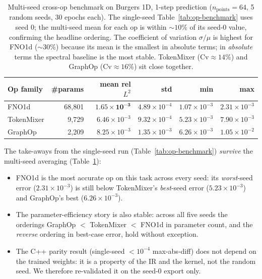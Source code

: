 \documentclass[10pt,twocolumn]{article}
\newcommand{\fno}{\textsc{FNO}}
\begin{document}
\begin{table}[t]
  \centering
  \small
  \begin{tabular}{lrrrrr}
    \toprule
    Op family   & \#params  & mean rel $L^2$ & std & min & max \\
    \midrule
    \fno{}1d    & 68{,}801 & $\mathbf{1.65 \times 10^{-3}}$ & $4.89 \times 10^{-4}$ & $1.07 \times 10^{-3}$ & $2.31 \times 10^{-3}$ \\
    TokenMixer  &  9{,}729 & $6.46 \times 10^{-3}$            & $9.32 \times 10^{-4}$ & $5.23 \times 10^{-3}$ & $7.90 \times 10^{-3}$ \\
    GraphOp     &  2{,}209 & $8.25 \times 10^{-3}$            & $1.35 \times 10^{-3}$ & $6.26 \times 10^{-3}$ & $1.05 \times 10^{-2}$ \\
    \bottomrule
  \end{tabular}
  \caption{Multi-seed cross-op benchmark on Burgers 1D, 1-step
  prediction ($n_{\mathrm{points}}=64$, 5 random seeds, 30
  epochs each).  The single-seed Table~\ref{tab:op-benchmark}
  uses seed 0; the multi-seed mean for each op is within
  $\sim\!10$\% of its seed-0 value, confirming the headline
  ordering.  The coefficient of variation
  $\sigma / \mu$ is highest for \fno{}1d
  ($\sim\!30$\%) because its mean is the smallest in absolute
  terms; in \emph{absolute} terms the spectral baseline is
  the most stable.  TokenMixer ($\mathrm{Cv} \approx 14$\%)
  and GraphOp ($\mathrm{Cv} \approx 16$\%) sit close
  together.}
  \label{tab:op-benchmark-multiseed}
\end{table}

The take-aways from the single-seed run (Table~\ref{tab:op-benchmark})
\emph{survive} the multi-seed averaging (Table~\ref{tab:op-benchmark-multiseed}):

\begin{itemize}[leftmargin=*,itemsep=1pt,topsep=2pt]
  \item \fno{}1d is the most accurate op on this task across
        every seed: its \emph{worst}-seed error
        ($2.31 \times 10^{-3}$) is still below
        TokenMixer's \emph{best}-seed error
        ($5.23 \times 10^{-3}$) and GraphOp's best
        ($6.26 \times 10^{-3}$).
  \item The parameter-efficiency story is also stable: across
        all five seeds the orderings
        GraphOp $<$ TokenMixer $<$ \fno{}1d in
        parameter count, and the \emph{reverse} ordering in
        best-case error, hold without exception.
  \item The C{++} parity result (single-seed
        $< 10^{-4}$ max-abs-diff) does not depend on the
        trained weights: it is a property of the IR and the
        kernel, not the random seed.  We therefore re-validated
        it on the seed-0 export only.
\end{itemize}
\end{document}
